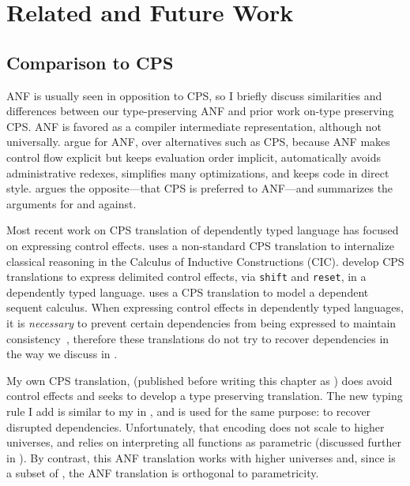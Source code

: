 \section{Related and Future Work}
\label{sec:anf:discuss}
\label{sec:anf:related}

\subsection{Comparison to CPS}
\label{sec:discuss:cps}
ANF is usually seen in opposition to CPS, so I briefly discuss similarities and
differences between our type-preserving ANF and prior work on-type preserving
CPS.
ANF is favored as a compiler intermediate representation, although not
universally.
\citet{maurer2017} argue for ANF, over alternatives such as CPS, because ANF
makes control flow explicit but keeps evaluation order implicit, automatically
avoids administrative redexes, simplifies many optimizations, and keeps code in
direct style.
\citet{kennedy2007} argues the opposite---that CPS is preferred to ANF---and
summarizes the arguments for and against.

Most recent work on CPS translation of dependently typed language has focused on
expressing control effects.
\citet{pedrot2017:lola} uses a non-standard CPS translation to internalize
classical reasoning in the Calculus of Inductive Constructions (CIC).
\citet{cong2018:lam-pi-s-r,cong2018:tfp} develop CPS translations to
express delimited control effects, via \texttt{shift} and \texttt{reset}, in a
dependently typed language.
\citet{miquey2017} uses a CPS translation to model a dependent sequent calculus.
When expressing control effects in dependently typed languages, it is
\emph{necessary} to prevent certain dependencies from being expressed to
maintain consistency~\cite{barthe2002,herbelin2005}, therefore these
translations do not try to recover dependencies in the way we discuss in
.

My own CPS translation,  (published before writing this
chapter as \citet{bowman2018:cps-sigma}) does avoid control effects and seeks to
develop a type preserving translation.
The new typing rule I add is similar to my  in \tlang, and is
used for the same purpose: to recover disrupted dependencies.
Unfortunately, that encoding does not scale to higher universes, and relies on
interpreting all functions as parametric (discussed further in
).
By contrast, this ANF translation works with higher universes and, since \tlang
is a subset of \slang, the ANF translation is orthogonal to parametricity.

